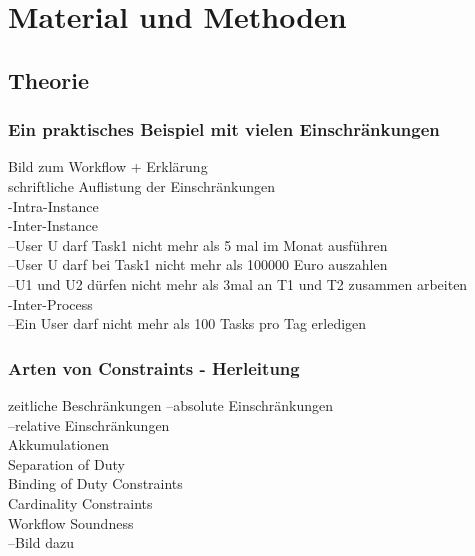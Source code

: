 
\chapter{Material und Methoden} %

\label{Chapter4} %


\section{Theorie}

\subsection{Ein praktisches Beispiel mit vielen Einschränkungen}
Bild zum Workflow + Erklärung\\
schriftliche Auflistung der Einschränkungen\\
-Intra-Instance \\
-Inter-Instance\\
--User U darf Task1 nicht mehr als 5 mal im Monat ausführen\\
--User U darf bei Task1 nicht mehr als 100000 Euro auszahlen\\
--U1 und U2 dürfen nicht mehr als 3mal an T1 und T2 zusammen arbeiten\\
-Inter-Process\\
--Ein User darf nicht mehr als 100 Tasks pro Tag erledigen\\
\subsection{Arten von Constraints - Herleitung}
zeitliche Beschränkungen
--absolute Einschränkungen\\
--relative Einschränkungen\\
Akkumulationen\\
Separation of Duty\\
Binding of Duty Constraints\\
Cardinality Constraints\\
Workflow Soundness\\
--Bild dazu\\



